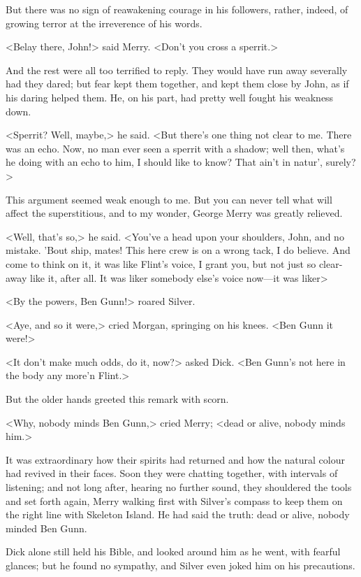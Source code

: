 But there was no sign of reawakening courage in his followers, rather, indeed, of growing terror at the irreverence of his words.

<Belay there, John!> said Merry. <Don't you cross a sperrit.>

And the rest were all too terrified to reply. They would have run away severally had they dared; but fear kept them together, and kept them close by John, as if his daring helped them. He, on his part, had pretty well fought his weakness down.

<Sperrit? Well, maybe,> he said. <But there's one thing not clear to me. There was an echo. Now, no man ever seen a sperrit with a shadow; well then, what's he doing with an echo to him, I should like to know? That ain't in natur', surely?>

This argument seemed weak enough to me. But you can never tell what will affect the superstitious, and to my wonder, George Merry was greatly relieved.

<Well, that's so,> he said. <You've a head upon your shoulders, John, and no mistake. 'Bout ship, mates! This here crew is on a wrong tack, I do believe. And come to think on it, it was like Flint's voice, I grant you, but not just so clear-away like it, after all. It was liker somebody else's voice now—it was liker\longdash>

<By the powers, Ben Gunn!> roared Silver.

<Aye, and so it were,> cried Morgan, springing on his knees. <Ben Gunn it were!>

<It don't make much odds, do it, now?> asked Dick. <Ben Gunn's not here in the body any more'n Flint.>

But the older hands greeted this remark with scorn.

<Why, nobody minds Ben Gunn,> cried Merry; <dead or alive, nobody minds him.>

It was extraordinary how their spirits had returned and how the natural colour had revived in their faces. Soon they were chatting together, with intervals of listening; and not long after, hearing no further sound, they shouldered the tools and set forth again, Merry walking first with Silver's compass to keep them on the right line with Skeleton Island. He had said the truth: dead or alive, nobody minded Ben Gunn.

Dick alone still held his Bible, and looked around him as he went, with fearful glances; but he found no sympathy, and Silver even joked him on his precautions.

